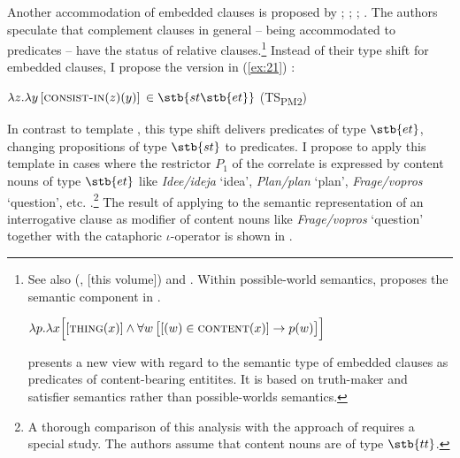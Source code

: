 \documentclass[output=paper,
colorlinks,
citecolor=brown,
newtxmath
]{langscibook}
\begin{document}
Another accommodation of embedded clauses is proposed by \citet{Kratzer2006,Kratzer2015,Kratzer2016}; \citet{Moulton2014,Moulton2015,Moulton2017}; \citet{Hanink2016}; \citet{Bogal-AllbrittenMoulton2018}. The authors speculate that complement clauses in general -- being accommodated to predicates -- have the status of relative clauses.\footnote{\label{fn:possibleworlds}See also \citeauthor{Arsenijevic2009} (\citeyear{Arsenijevic2009}, \citeyear{Arsenijevic2021} [this volume]) and \citet{CaponigroPolinsky2011}. Within possible-world semantics, \citet{Kratzer2016} proposes the semantic component in .

\ea\label{ex:fn28} $\lambda p . \lambda x \Big[[\textsc{thing} (x)] \wedge \forall w \, \big[[{(w)} \in \textsc{content} (x)] \rightarrow p(w)\big]\Big]$ \z

\noindent \citet{Moltmann2020} presents a new view with regard to the semantic type of embedded clauses as predicates of content-bearing entitites. It is based on truth-maker and satisfier semantics rather than possible-worlds semantics.} Instead of their type shift for embedded clauses, I propose the version in (\ref{ex:21}) \citep[see][]{Zimmermann2016b,Zimmermann2018a,Zimmermann2019a,Zimmermann2019c}:

\ea\label{ex:21} $\lambda z . \lambda y \, [\textsc{consist-in} (z) (y)]$ {\small $\in \stb{st\stb{et}}$} \hfill (TS\textsubscript{PM2}) \z

\noindent In contrast to template , this type shift delivers predicates of type $\stb{et}$, changing propositions of type $\stb{st}$ to predicates. I propose to apply this template in cases where the restrictor $P_1$ of the correlate is expressed by content nouns of type $\stb{et}$ like \textit{Idee/ideja} `idea', \textit{Plan/plan} `plan', \textit{Frage/vopros} `question', etc. \citep[see][]{Zimmermann2019a}.\footnote{A thorough comparison of this analysis with the approach of \citet{Fabricius-Hansen1989} requires a special study. The authors assume that content nouns are of type $\stb{tt}$.}
The result of applying  to the semantic representation of an interrogative clause as modifier of content nouns like \textit{Frage/vopros} `question' together with the cataphoric $\iota$-operator is shown in .
\end{document}

